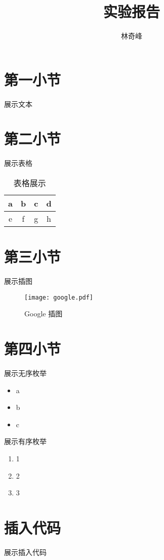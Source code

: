 \documentclass{article}       %
\author{林奇峰}                     %
\title{实验报告}                    %
\begin{document}

\maketitle

\section{第一小节}
    展示文本

\section{第二小节}
    展示表格
    \begin{table}[h]                %
        \centering                  %
        \begin{tabular}{|c|c|c|c|}  %
            \hline                  %
            a & b & c & d\\         %
            \hline
            e & f & g & h\\
            \hline
        \end{tabular}
        \caption{表格展示}
    \end{table}

\section{第三小节}
    展示插图
    \begin{figure}[h]               %
        \centering
        \texttt{[image: google.pdf]}
        \caption{Google 插图}       %
    \end{figure}

\section{第四小节}
    展示无序枚举
    \begin{itemize}
        \item a
        \item b
        \item c
    \end{itemize}

    展示有序枚举
    \begin{enumerate}
        \item 1
        \item 2
        \item 3
    \end{enumerate}

\section{插入代码}
    展示插入代码
 
\end{document}
